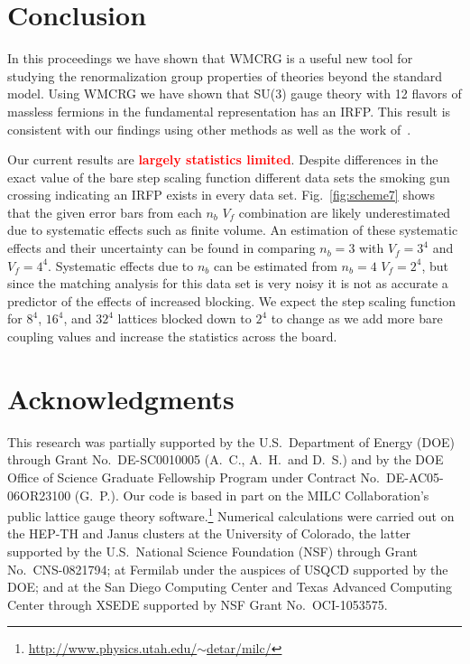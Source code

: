 \documentclass{PoS}
\newcommand{\fig}[1]{Fig.~\ref{#1}}
\newcommand{\TODO}[1]{\textcolor{red}{{\bf #1}}}
\begin{document}
\section{Conclusion}
In this proceedings we have shown that WMCRG is a useful new tool for studying the renormalization group properties of theories beyond the standard model.
Using WMCRG we have shown that SU(3) gauge theory with 12 flavors of massless fermions in the fundamental representation has an IRFP.
This result is consistent with our findings using other methods as well as the work of~\TODO{\cite{}}.

Our current results are \TODO{largely statistics limited}. %
Despite differences in the exact value of the bare step scaling function different data sets the smoking gun crossing indicating an IRFP exists in every data set.
\fig{fig:scheme7} shows that the given error bars from each $n_b$ $V_f$ combination are likely underestimated due to systematic effects such as finite volume.
An estimation of these systematic effects and their uncertainty can be found in comparing $n_b = 3$ with $V_f = 3^4$ and $V_f = 4^4$.
Systematic effects due to $n_b$ can be estimated from $n_b = 4$ $V_f = 2^4$, but since the matching analysis for this data set is very noisy it is not as accurate a predictor of the effects of increased blocking.
We expect the step scaling function for $8^4$, $16^4$, and $32^4$ lattices blocked down to $2^4$ to change as we add more bare coupling values and increase the statistics across the board.



\section*{Acknowledgments}
This research was partially supported by the U.S.~Department of Energy (DOE) through Grant No.~DE-SC0010005 (A.~C., A.~H.\ and D.~S.) and by the DOE Office of Science Graduate Fellowship Program under Contract No.~DE-AC05-06OR23100 (G.~P.).
Our code is based in part on the MILC Collaboration's public lattice gauge theory software.\footnote{\href{http://www.physics.utah.edu/~detar/milc/}{http://www.physics.utah.edu/$\sim$detar/milc/}}
Numerical calculations were carried out on the HEP-TH and Janus clusters at the University of Colorado, the latter supported by the U.S.~National Science Foundation (NSF) through Grant No.~CNS-0821794; at Fermilab under the auspices of USQCD supported by the DOE; and at the San Diego Computing Center and Texas Advanced Computing Center through XSEDE supported by NSF Grant No.~OCI-1053575.



{\renewcommand{\baselinestretch}{0.86} %
  
  
}
\end{document}
